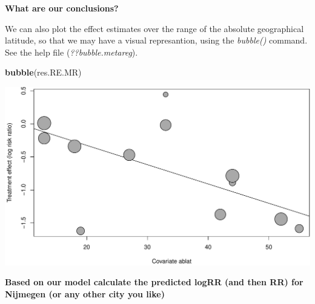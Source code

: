 \documentclass[]{article}
\newenvironment{Shaded}{\begin{snugshade}}{\end{snugshade}}
\newcommand{\KeywordTok}[1]{\textcolor[rgb]{0.13,0.29,0.53}{\textbf{#1}}}
\newcommand{\NormalTok}[1]{#1}
\begin{document}
\newline 

\newline 

\textbf{What are our conclusions?}

\newline 

\newline 

\newline 

\newline 

\newline 

We can also plot the effect estimates over the range of the absolute
geographical latitude, so that we may have a visual represantion, using
the \emph{bubble()} command. See the help file
(\emph{??bubble.metareg}).

\begin{Shaded}
\begin{Highlighting}[]
\KeywordTok{bubble}\NormalTok{(res.RE.MR)}
\end{Highlighting}
\end{Shaded}

\includegraphics{Figs/unnamed-chunk-16-1.pdf}

\textbf{Based on our model calculate the predicted logRR (and then RR)
for Nijmegen (or any other city you like)}

\newline 

\newline 

\newline 

\newline 
\end{document}
